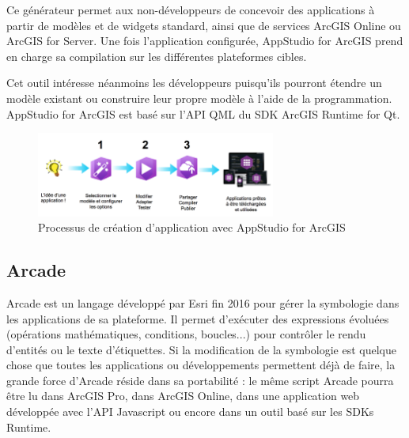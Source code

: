 \documentclass[11pt]{article}
\begin{document}
Ce générateur permet aux non-développeurs de concevoir des applications à partir de modèles et de widgets standard, ainsi que de services ArcGIS Online ou ArcGIS for Server. Une fois l'application configurée, AppStudio for ArcGIS prend en charge sa compilation sur les différentes plateformes cibles. 

Cet outil intéresse néanmoins les développeurs puisqu'ils pourront étendre un modèle existant ou construire leur propre modèle à l'aide de la programmation. AppStudio for ArcGIS est basé sur l'API QML du SDK ArcGIS Runtime for Qt.

\begin{figure}[H]
	\center \includegraphics[width=0.70\textwidth]{img/cours/AppStudio_for_ArcGIS-2.png}
	\caption{Processus de création d'application avec AppStudio for ArcGIS}
\end{figure}


\subsection{Arcade}
Arcade est un langage développé par Esri fin 2016 pour gérer la symbologie dans les applications de sa plateforme. Il permet d'exécuter des expressions évoluées (opérations mathématiques, conditions, boucles...) pour contrôler le rendu d'entités ou le texte d'étiquettes. Si la modification de la symbologie est quelque chose que toutes les applications ou développements permettent déjà de faire, la grande force d'Arcade réside dans sa portabilité : le même script Arcade pourra être lu dans ArcGIS Pro, dans ArcGIS Online, dans une application web développée avec l'API Javascript ou encore dans un outil basé sur les SDKs Runtime.
\end{document}
